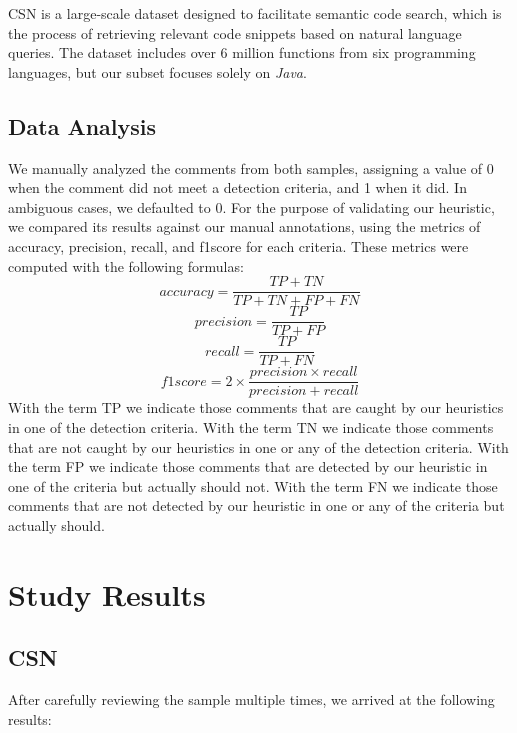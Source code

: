 \noindent CSN is a large-scale dataset designed to facilitate semantic code search, which is the process of retrieving relevant code snippets based on natural language queries.
The dataset includes over 6 million functions from six programming languages, but our subset focuses solely on \textit{Java}.

\subsection{Data Analysis}
We manually analyzed the comments from both samples, assigning a value of 0 when the comment did not meet a detection criteria, and 1 when it did. In ambiguous cases, we defaulted to 0. 
For the purpose of validating our heuristic, we compared its results against our manual annotations, using the metrics of accuracy, precision, recall, and f1score for each criteria. These metrics were computed with the following formulas:
\begin{equation*}
	accuracy = \frac{TP + TN}{TP + TN + FP + FN}		
\end{equation*}
\begin{equation*}
	precision = \frac{TP}{TP + FP}
\end{equation*}
\begin{equation*}
	recall = \frac{TP}{TP + FN}
\end{equation*}
\begin{equation*}
	f1score = 2 \times \frac{precision \times recall}{precision + recall}
\end{equation*}
With the term TP we indicate those comments that are caught by our heuristics in one of the detection criteria. With the term TN we indicate those comments that are not caught by our heuristics in one or any of the detection criteria. With the term FP we indicate those comments that are detected by our heuristic in one of the criteria but actually should not. With the term FN we indicate those comments that are not detected by our heuristic in one or any of the criteria but actually should.

\newpage

\section{Study Results}

\subsection{CSN}
After carefully reviewing the sample multiple times, we arrived at the following results:

